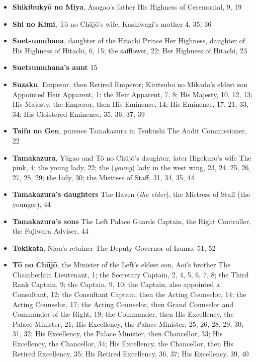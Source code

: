 \documentclass{article}
\begin{document}
\begin{multicols}{2}
\begin{itemize}[
			label=,
			leftmargin=0em,
			rightmargin=-1.5em,
			itemindent=-2em,
			nosep,
		]
		\item \textbf{Shikibukyō no Miya}, Asagao's father His Highness of Ceremonial, 9, 19

		\item \textbf{Shi no Kimi}, Tō no Chūjō's wife, Kashiwagi's mother 4, 35, 36

		\item \textbf{Suetsumuhana}, daughter of the Hitachi Prince Her Highness, daughter of His Highness of Hitachi, 6, 15;
		      the safflower, 22;
		      Her Highness of Hitachi, 23

		\item \textbf{Suetsumuhana's aunt} 15

		\item \textbf{Suzaku}, Emperor, then Retired Emperor; Kiritsubo no Mikado's eldest son Appointed Heir Apparent, 1;
		      the Heir Apparent, 7, 8;
		      His Majesty, 10, 12, 13;
		      His Majesty, the Emperor, then His Eminence, 14;
		      His Eminence, 17, 21, 33, 34;
		      His Cloistered Eminence, 35, 36, 37, 39

		\item \textbf{Taifu no Gen}, pursues Tamakazura in Tsukushi The Audit Commissioner, 22

		\item \textbf{Tamakazura}, Yūgao and Tō no Chūjō's daughter, later Higekuro's wife The pink, 4;
		      the young lady, 22;
		      the (\textit{young}) lady in the west wing, 23, 24, 25, 26, 27, 28, 29;
		      the lady, 30;
		      the Mistress of Staff, 31, 34, 35, 44

		\item \textbf{Tamakazura's daughters} The Haven (\textit{the elder}), the Mistress of Staff (the younger), 44

		\item \textbf{Tamakazura's sons} The Left Palace Guards Captain, the Right Controller, the Fujiwara Adviser, 44

		\item \textbf{Tokikata}, Niou's retainer The Deputy Governor of Izumo, 51, 52

		\item \textbf{Tō no Chūjō}, the Minister of the Left's eldest son, Aoi's brother The Chamberlain Lieutenant, 1;
		      the Secretary Captain, 2, 4, 5, 6, 7, 8;
		      the Third Rank Captain, 9;
		      the Captain, 9, 10;
		      the Captain, also appointed a Consultant, 12;
		      the Consultant Captain, then the Acting Counselor, 14;
		      the Acting Counselor, 17;
		      the Acting Counselor, then Grand Counselor and Commander of the Right, 19;
		      the Commander, then His Excellency, the Palace Minister, 21;
		      His Excellency, the Palace Minister, 25, 26, 28, 29, 30, 31, 32;
		      His Excellency, the Palace Minister, then Chancellor, 33;
		      His Excellency, the Chancellor, 34;
		      His Excellency, the Chancellor, then His Retired Excellency, 35;
		      His Retired Excellency, 36, 37;
		      His Excellency, 39, 40


\end{itemize}
\end{multicols}
\end{document}
